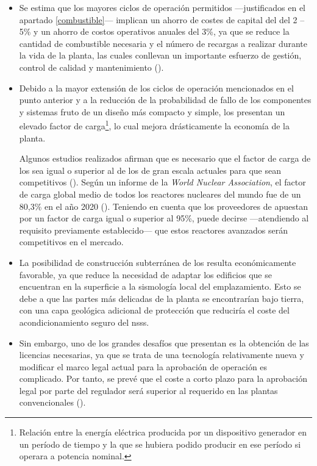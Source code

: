 \begin{itemize}
  \item Se estima que los mayores ciclos de operación permitidos ---justificados en el apartado \ref{combustible}--- implican un ahorro de costes de capital del del 2 – 5\% y un ahorro de costos operativos anuales del 3\%, ya que se reduce la cantidad de combustible necesaria y el número de recargas a realizar durante la vida de la planta, las cuales conllevan un importante esfuerzo de gestión, control de calidad y mantenimiento (\cite{overview_smrs}).
  
  \item Debido a la mayor extensión de los ciclos de operación mencionados en el punto anterior y a la reducción de la probabilidad de fallo de los componentes y sistemas fruto de un diseño más compacto y simple, los  presentan un elevado \gls{factor de carga}\footnote{Relación entre la energía eléctrica producida por un dispositivo generador en un período de tiempo y la que se hubiera podido producir en ese período si operara a potencia nominal.}, lo cual mejora drásticamente la economía de la planta. 
  
  Algunos estudios realizados afirman que es necesario que el factor de carga de los  sea igual o superior al de los  de gran escala actuales para que sean competitivos (\cite{SHROPSHIRE2011299}). Según un informe de la \emph{World Nuclear Association}, el factor de carga global medio de todos los reactores nucleares del mundo fue de un 80,3\% en el año 2020 (\cite{wna_report_2021}). Teniendo en cuenta que los proveedores de  apuestan por un factor de carga igual o superior al 95\%, puede decirse ---atendiendo al requisito previamente establecido--- que estos reactores avanzados serán competitivos en el mercado.
  
  \item La posibilidad de construcción subterránea de los  resulta económicamente favorable, ya que reduce la necesidad de adaptar los edificios que se encuentran en la superficie a la sismología local del emplazamiento. Esto se debe a que las partes más delicadas de la planta se encontrarían bajo tierra, con una capa geológica adicional de protección que reduciría el coste del acondicionamiento seguro del \acrshort{nsss}.
  
  \item Sin embargo, uno de los grandes desafíos que presentan es la obtención de las licencias necesarias, ya que se trata de una tecnología relativamente nueva y modificar el marco legal actual para la aprobación de operación es complicado. Por tanto, se prevé que el coste a corto plazo para la aprobación legal por parte del regulador será superior al requerido en las plantas convencionales (\cite{uxc2015historical}).
  
\end{itemize}

